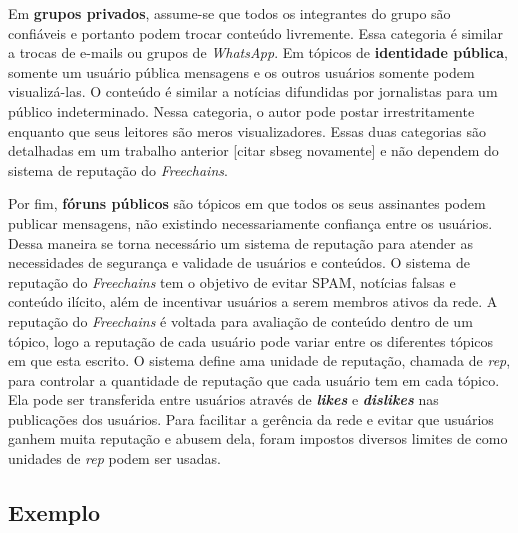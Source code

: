 \documentclass[12pt]{article}
\newcommand{\FC} {\emph{Freechains}\xspace}
\begin{document}
Em \textbf{grupos privados}, assume-se que todos os integrantes do grupo são confiáveis e portanto podem trocar conteúdo livremente.
Essa categoria é similar a trocas de e-mails ou grupos de \emph{WhatsApp}.
Em tópicos de \textbf{identidade pública}, somente um usuário pública mensagens e os outros usuários somente podem visualizá-las.
O conteúdo é similar a notícias difundidas por jornalistas para um público indeterminado. %
Nessa categoria, o autor pode postar irrestritamente enquanto que seus leitores são meros visualizadores. %
Essas duas categorias são detalhadas em um trabalho anterior [citar sbseg novamente] e não dependem do sistema de reputação do \FC.

Por fim, \textbf{fóruns públicos} são tópicos em que todos os seus assinantes podem publicar mensagens, não existindo necessariamente confiança entre os usuários.
Dessa maneira se torna necessário um sistema de reputação para atender as necessidades de segurança e validade de usuários e conteúdos.
O sistema de reputação do \FC tem o objetivo de evitar SPAM, notícias falsas e conteúdo ilícito, além de incentivar usuários a serem membros ativos da rede.
A reputação do \FC é voltada para avaliação de conteúdo dentro de um tópico, logo a reputação de cada usuário pode variar entre os diferentes tópicos em que esta escrito. 
O sistema define ama unidade de reputação, chamada de \emph{rep}, para controlar a quantidade de reputação que cada usuário tem em cada tópico.
Ela pode ser transferida entre usuários através de \textbf{\emph{likes}} e \textbf{\emph{dislikes}} nas publicações dos usuários.
Para facilitar a gerência da rede e evitar que usuários ganhem muita reputação e abusem dela, foram impostos diversos limites de como unidades de \emph{rep} podem ser usadas. 




\subsection{Exemplo}
\end{document}
